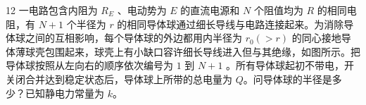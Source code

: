 \begin{problem}[第30届全国中学生物理竞赛决赛][导体球半径与电路电荷分布]{12}
一电路包含内阻为 $R_{E}$ 、电动势为 $E$ 的直流电源和 $N$ 个阻值均为 $R$ 的相同电阻，有 $N+1$ 个半径为 $r$ 的相同导体球通过细长导线与电路连接起来。为消除导体球之间的互相影响，每个导体球的外边都用内半径为 $r_{0}(>r)$ 的同心接地导体薄球壳包围起来，球壳上有小缺口容许细长导线进入但与其绝缘，如图所示。把导体球按照从左向右的顺序依次编号为 $1$ 到 $N+1$ 。所有导体球起初不带电，开关闭合并达到稳定状态后，导体球上所带的总电量为 $Q$。问导体球的半径是多少？已知静电力常量为 $k$。
\end{problem}